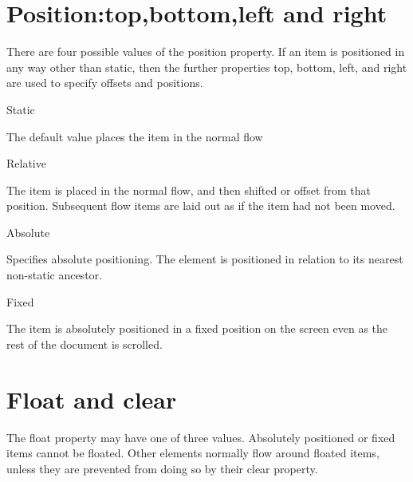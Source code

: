 \section{Position:top,bottom,left and right}


There are four possible values of the position property. If an item is positioned in any way other than static, then the further properties top, bottom, left, and right are used to specify offsets and positions.


\begin{compactitem}
\item Static

The default value places the item in the normal flow

\item Relative

The item is placed in the normal flow, and then shifted or offset from that position. Subsequent flow items are laid out as if the item had not been moved.

\item Absolute

Specifies absolute positioning. The element is positioned in relation to its nearest non-static ancestor.

\item Fixed

The item is absolutely positioned in a fixed position on the screen even as the rest of the document is scrolled.


\end{compactitem}


\section{Float and clear}


The float property may have one of three values. Absolutely positioned or fixed items cannot be floated. Other elements normally flow around floated items, unless they are prevented from doing so by their clear property.


